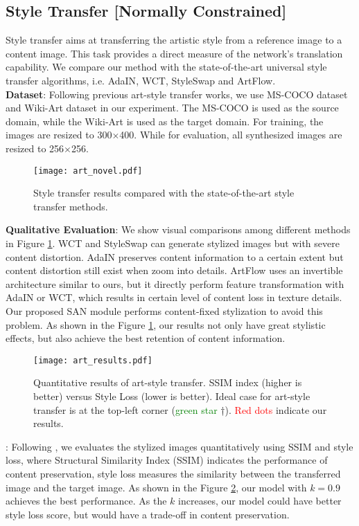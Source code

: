 \documentclass[runningheads]{llncs}
\begin{document}
\subsection{Style Transfer [Normally Constrained]}
Style transfer aims at transferring the artistic style from a reference image to a content image. This task provides a direct measure of the network's translation capability. We compare our method with the state-of-the-art universal style transfer algorithms, i.e. AdaIN\cite{huang2017arbitrary}, WCT\cite{li2017universal}, StyleSwap\cite{chen2016fast} and ArtFlow\cite{an2021artflow}.\\[1ex]
\noindent\textbf{Dataset}: Following previous art-style transfer works, we use MS-COCO\cite{lin2014microsoft} dataset and Wiki-Art\cite{wikiart} dataset in our experiment. The MS-COCO is used as the source domain, while the Wiki-Art is used as the target domain. For training, the images are resized to 300$\times$400. While for evaluation, all synthesized images are resized to 256$\times$256.\\[1ex]
\begin{figure}[!b]
  \centering
  \texttt{[image: art\_novel.pdf]}
  \caption{Style transfer results compared with the state-of-the-art style transfer methods.}
  \label{fig:art_pic}
\end{figure}
\noindent\textbf{Qualitative Evaluation}:
We show visual comparisons among different methods in Figure \ref{fig:art_pic}. WCT and StyleSwap can generate stylized images but with severe content distortion. AdaIN preserves content information to a certain extent but content distortion still exist when zoom into details. ArtFlow uses an invertible architecture similar to ours, but it directly perform feature transformation with AdaIN or WCT, which results in certain level of content loss in texture details. Our proposed SAN module performs content-fixed stylization to avoid this problem. As shown in the Figure \ref{fig:art_pic}, our results not only have great stylistic effects, but also achieve the best retention of content information.\\[1ex]
\begin{figure}[!ht]
  \centering
  \texttt{[image: art\_results.pdf]}
  \caption{Quantitative results of art-style transfer. SSIM index (higher is better) versus Style Loss (lower is better). Ideal case for art-style transfer is at the top-left corner (\textcolor{green}{green star} †). \textcolor{red}{Red dots} indicate our results.}
  \label{fig:style}
\end{figure}
:
Following \cite{Hong_2021_ICCV}, we evaluates the stylized images quantitatively using SSIM and style loss, where Structural Similarity Index (SSIM) indicates the performance of content preservation, style loss measures the similarity between the transferred image and the target image. As shown in the Figure \ref{fig:style}, our model with $k=0.9$ achieves the best performance. As the $k$ increases, our model could have better style loss score, but would have a trade-off in content preservation.
\end{document}
